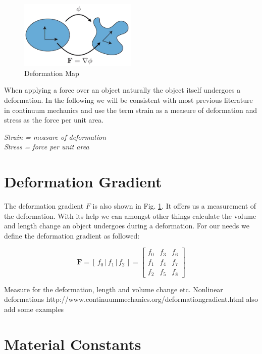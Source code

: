 \begin{figure}[!htbp]
	\centering
	\includegraphics[width=0.5\textwidth]{resources/deformation_map}
	\caption{Deformation Map {\cite{STREAM2018}}}
	\label{fig:deformationmap}
\end{figure}

When applying a force over an object naturally the object itself undergoes a deformation. In the following we will be consistent with most previous literature in continuum mechanics and use the term strain as a measure of deformation and stress as the force per unit area.

\begin{addmargin}[2cm]{2cm}
\textit{Strain = measure of deformation}  \\
\textit{Stress = force per unit area} 
\end{addmargin}


\section{Deformation Gradient}

The deformation gradient $F$ is also shown in Fig. \ref{fig:deformationmap}. It offers us a measurement of the deformation. With its help we can amongst other things calculate the volume and length change an object undergoes during a deformation.
For our needs we define the deformation gradient as followed:

\[
\textbf{F} = \left[ \,f_0\, \bigg| \,f_1\, \bigg| \,f_2\, \right] = \begin{bmatrix} f_0 & f_3 & f_6 \\ f_1 & f_4 & f_7 \\ f_2 & f_5 & f_8 \end{bmatrix}
\]


Measure for the deformation, length and volume change etc.
Nonlinear deformations
http://www.continuummechanics.org/deformationgradient.html
also add some examples

\section{Material Constants}

